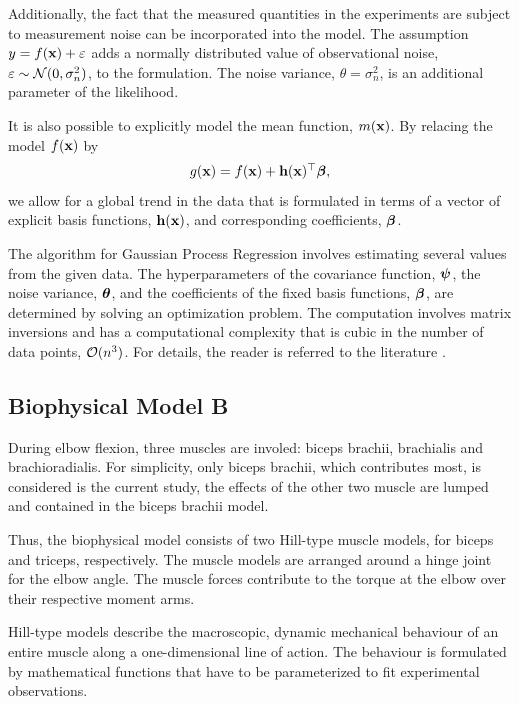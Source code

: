 Additionally, the fact that the measured quantities in the experiments are subject to measurement noise can be incorporated into the model.
The assumption $y = f(\textbf{x}) + \varepsilon$ adds a normally distributed value of observational noise, $\varepsilon \sim \mathcal{N}(0,\sigma_n^2)$, to the formulation. The noise variance, $\theta = \sigma_n^2$, is an additional parameter of the likelihood. 

It is also possible to explicitly model the mean function, $m(\textbf{x})$. By relacing the model $f(\textbf{x})$ by
\begin{equation*}
  \begin{array}{lll}
    g(\textbf{x}) = f(\textbf{x}) + \textbf{h}(\textbf{x})^\top \boldsymbol{\beta},
  \end{array}
\end{equation*}
we allow for a global trend in the data that is formulated in terms of a vector of explicit basis functions, $\textbf{h}(\textbf{x})$, and corresponding coefficients, $\boldsymbol{\beta}$.

The algorithm for Gaussian Process Regression involves estimating several values from the given data. The hyperparameters of the covariance function, $\boldsymbol{\psi}$, the noise variance, $\boldsymbol{\theta}$, and the coefficients of the fixed basis functions, $\boldsymbol{\beta}$, are determined by solving an optimization problem. The computation involves matrix inversions and has a computational complexity that is cubic in the number of data points, $\mathcal{O}(n^3)$. For details, the reader is referred to the literature \cite{Rasmussen2005,kuss2006gaussian}.

\subsection{Biophysical Model B}\label{sec:biophysical_model}

During elbow flexion, three muscles are involed: biceps brachii, brachialis and brachioradialis. For simplicity, only biceps brachii, which contributes most, is considered is the current study, the effects of the other two muscle are lumped and contained in the biceps brachii model.

Thus, the biophysical model consists of two Hill-type muscle models, for biceps and triceps, respectively. The muscle models are arranged around a hinge joint for the elbow angle. The muscle forces contribute to the torque at the elbow over their respective moment arms.

Hill-type models describe the macroscopic, dynamic mechanical behaviour of an entire muscle along a one-dimensional line of action.
The behaviour is formulated by mathematical functions that have to be parameterized to fit experimental observations.


